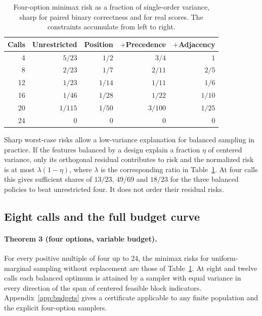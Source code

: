 \documentclass{article}
\begin{document}
\begin{table}[t]
\caption{Four-option minimax risk as a fraction of single-order
variance, sharp for paired binary correctness and for real scores.
The constraints accumulate from left to right.}
\label{tab:frontier}
\centering
\small
\setlength{\tabcolsep}{4pt}
\begin{tabular}{@{}rrrrr@{}}
\toprule
Calls & Unrestricted & Position & $+$Precedence & $+$Adjacency \\
\midrule
4  & $5/23$  & $1/2$  & $3/4$    & $1$ \\
8  & $2/23$  & $1/7$  & $2/11$   & $2/5$ \\
12 & $1/23$  & $1/14$ & $1/11$   & $1/6$ \\
16 & $1/46$  & $1/28$ & $1/22$   & $1/10$ \\
20 & $1/115$ & $1/50$ & $3/100$  & $1/25$ \\
24 & $0$     & $0$    & $0$      & $0$ \\
\bottomrule
\end{tabular}
\end{table}

Sharp worst-case risks allow a low-variance explanation for balanced
sampling in practice. If the features balanced by a design explain
a fraction \(\eta\) of centered variance, only its orthogonal residual
contributes to risk and the normalized risk is at most
\(\lambda(1-\eta)\), where \(\lambda\) is the corresponding ratio in
Table~\ref{tab:frontier}. At four calls this gives sufficient shares of \(13/23\),
\(49/69\) and \(18/23\) for the three balanced policies to beat
unrestricted four. It does not order their residual risks.

\subsection{Eight calls and the full budget curve}
\label{sec:budget}
\paragraph{Theorem 3 (four options, variable budget).}
For every positive multiple of four up to 24, the minimax risks for
uniform-marginal sampling without replacement are those of
Table~\ref{tab:frontier}. At eight and twelve calls each balanced
optimum is attained by a sampler with equal variance in every
direction of the span of centered feasible block indicators.
Appendix~\ref{app:budgets} gives a certificate applicable to any finite
population and the explicit four-option samplers.
\end{document}
